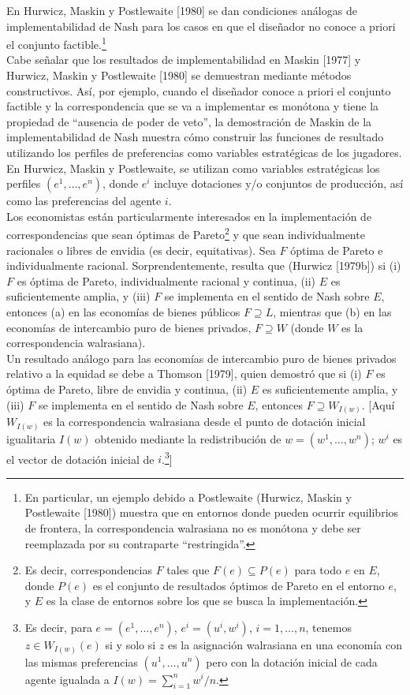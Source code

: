 \documentclass[12pt, letterpaper]{article}
\begin{document}
En Hurwicz, Maskin y Postlewaite [1980] se dan condiciones análogas de implementabilidad de Nash para los casos en que el diseñador no conoce a priori el conjunto factible.\footnote{En particular, un ejemplo debido a Postlewaite (Hurwicz, Maskin y Postlewaite [1980]) muestra que en entornos donde pueden ocurrir equilibrios de frontera, la correspondencia walrasiana no es monótona y debe ser reemplazada por su contraparte ``restringida''.} \\

Cabe señalar que los resultados de implementabilidad en Maskin [1977] y Hurwicz, Maskin y Postlewaite [1980] se demuestran mediante métodos constructivos. Así, por ejemplo, cuando el diseñador conoce a priori el conjunto factible y la correspondencia que se va a implementar es monótona y tiene la propiedad de ``ausencia de poder de veto'', la demostración de Maskin de la implementabilidad de Nash muestra cómo construir las funciones de resultado utilizando los perfiles de preferencias como variables estratégicas de los jugadores. En Hurwicz, Maskin y Postlewaite, se utilizan como variables estratégicas los perfiles $(e^{1}, \dots, e^{n})$, donde $e^{i}$ incluye dotaciones y/o conjuntos de producción, así como las preferencias del agente $i$. \\

Los economistas están particularmente interesados en la implementación de correspondencias que sean óptimas de Pareto\footnote{Es decir, correspondencias $F$ tales que $F(e) \subseteq P(e)$ para todo $e$ en $E$, donde $P(e)$ es el conjunto de resultados óptimos de Pareto en el entorno $e$, y $E$ es la clase de entornos sobre los que se busca la implementación.} y que sean individualmente racionales o libres de envidia (es decir, equitativas). Sea $F$ óptima de Pareto e individualmente racional. Sorprendentemente, resulta que (Hurwicz [1979b]) si (i) $F$ es óptima de Pareto, individualmente racional y continua, (ii) $E$ es suficientemente amplia, y (iii) $F$ se implementa en el sentido de Nash sobre $E$, entonces (a) en las economías de bienes públicos $F \supseteq L$, mientras que (b) en las economías de intercambio puro de bienes privados, $F \supseteq W$ (donde $W$ es la correspondencia walrasiana). \\

Un resultado análogo para las economías de intercambio puro de bienes privados relativo a la equidad se debe a Thomson [1979], quien demostró que si (i) $F$ es óptima de Pareto, libre de envidia y continua, (ii) $E$ es suficientemente amplia, y (iii) $F$ se implementa en el sentido de Nash sobre $E$, entonces $F \supseteq W_{I(w)}$. [Aquí $W_{I(w)}$ es la correspondencia walrasiana desde el punto de dotación inicial igualitaria $I(w)$ obtenido mediante la redistribución de $w = (w^{1}, \dots, w^{n})$; $w^{i}$ es el vector de dotación inicial de $i$.\footnote{Es decir, para $e = (e^{1}, \dots, e^{n})$, $e^{i} = (u^{i}, w^{i})$, $i = 1, \dots, n$, tenemos $z \in W_{I(w)}(e)$ si y solo si $z$ es la asignación walrasiana en una economía con las mismas preferencias $(u^{1}, \dots, u^{n})$ pero con la dotación inicial de cada agente igualada a $I(w) = \sum_{i=1}^{n} w^{i}/n$.}] \\
\end{document}
